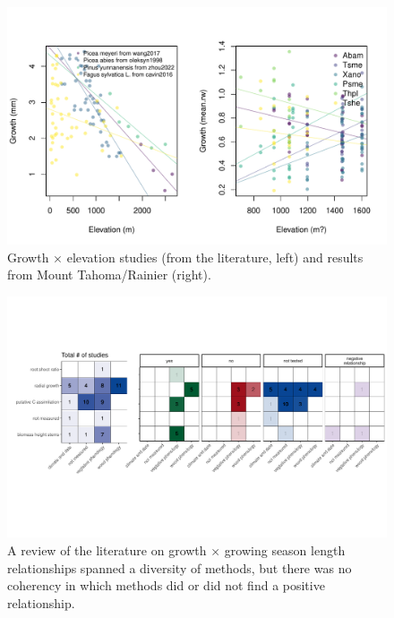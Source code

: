 \documentclass[11pt]{article}
\begin{document}
\begin{figure}[h!]
\includegraphics[width=1\textwidth]{..//analyses/growthxelevationetc/figures/growthxelev2part.pdf}
\caption{Growth $\times$ elevation studies (from the literature, left) and results from Mount Tahoma/Rainier (right).}
\label{fig:gxelev}
\end{figure}

\clearpage
\begin{figure}[h!]
\includegraphics[width=1\textwidth]{..//figures/heatmaps/combinedheatmap_gslxgrowth_simple.pdf}
\caption{A review of the literature on growth $\times$ growing season length relationships spanned a diversity of methods, but there was no coherency in which methods did or did not find a positive relationship.}
\label{fig:heatmaps}
\end{figure}
\end{document}

